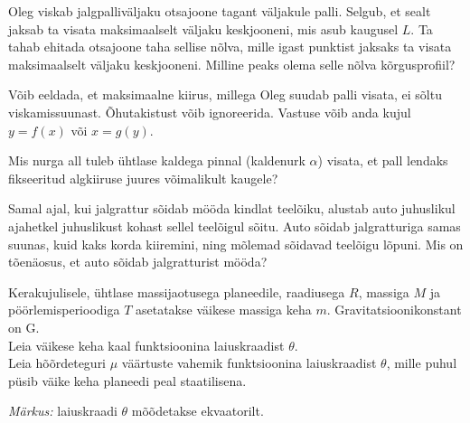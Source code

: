 \documentclass[10pt]{article}
\begin{document}
\setAuthor{}

Oleg viskab jalgpalliväljaku otsajoone tagant väljakule palli. Selgub, et sealt
jaksab ta visata maksimaalselt väljaku keskjooneni, mis asub kaugusel $L$. Ta
tahab ehitada otsajoone taha sellise nõlva, mille igast punktist jaksaks ta visata
maksimaalselt väljaku keskjooneni. Milline peaks olema selle nõlva kõrgusprofiil?

Võib eeldada, et maksimaalne kiirus, millega Oleg suudab palli visata, ei sõltu
viskamissuunast. Õhutakistust võib ignoreerida. Vastuse võib anda kujul $y=f(x)$
või $x=g(y)$.
\probend
\bigskip


Mis nurga all tuleb ühtlase kaldega pinnal (kaldenurk $\alpha$) visata, et pall lendaks fikseeritud algkiiruse juures võimalikult kaugele?
\probend
\bigskip


Samal ajal, kui jalgrattur sõidab mööda kindlat teelõiku, alustab auto juhuslikul ajahetkel juhuslikust kohast sellel teelõigul sõitu. Auto sõidab jalgratturiga samas suunas, kuid kaks korda kiiremini, ning mõlemad sõidavad teelõigu lõpuni. Mis on tõenäosus, et auto sõidab jalgratturist mööda?
\probend
\bigskip


Kerakujulisele, ühtlase massijaotusega planeedile, raadiusega $R$, massiga $M$ ja pöörlemisperioodiga $T$ asetatakse väikese massiga keha $m$. Gravitatsioonikonstant on G.\\
\osa Leia väikese keha kaal funktsioonina laiuskraadist $\theta$.\\
\osa Leia hõõrdeteguri $\mu$ väärtuste vahemik funktsioonina laiuskraadist $\theta$, mille puhul püsib väike keha planeedi peal staatilisena. \par
\emph{Märkus:} laiuskraadi $\theta$ mõõdetakse ekvaatorilt.
\probend
\bigskip

\end{document}
